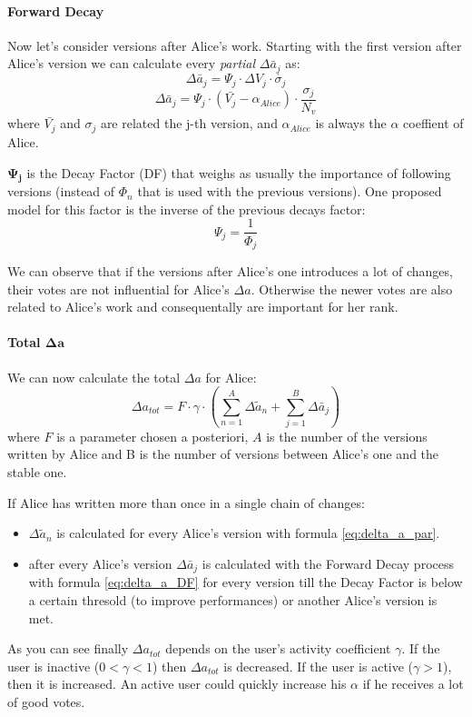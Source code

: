 \documentclass[a4paper,11pt]{article}
\newcommand{\al}{$\alpha$ }
\begin{document}
\paragraph{Forward Decay} Now let's consider versions after Alice's work. Starting with the first version after Alice's version we can calculate every \emph{partial} $\Delta \bar{a}_j$ as:
\begin{equation}
\Delta \bar{a}_j = \Psi_j \cdot \Delta V_j \cdot \mathring{\sigma_j}
\end{equation}
\begin{equation} \label{eq:delta_a_DF}
\Delta \bar{a}_j = \Psi_j \cdot \left(\bar{V_j}- \alpha_{Alice}\right) \cdot \frac{\sigma_j}{N_v}
\end{equation}
where $\bar{V_j}$ and $\sigma_j$ are related the j-th version, and $\alpha_{Alice}$ is always the \al coeffient of Alice.

$\mathbf{\Psi_j}$ is the Decay Factor (DF) that weighs as usually the importance of following versions (instead of $\Phi_n$ that is used with the previous versions). One proposed model for this factor is the inverse of the previous decays factor:
\begin{equation}
\Psi_j = \frac{1}{\Phi_j}
\end{equation}


We can observe that if the versions after Alice's one introduces a lot of changes, their votes are not influential for Alice's $\Delta a$. Otherwise the newer votes are also related to Alice's work and consequentally are important for her rank.

\paragraph{Total $\boldsymbol{\Delta a}$} We can now calculate the total $\Delta a$ for Alice:
\begin{equation}
\Delta a_{tot} = F \cdot \gamma \cdot \left(\sum_{n=1}^A \Delta \tilde{a}_n + \sum_{j=1}^B \Delta \bar{a}_j\right)
\end{equation}
where $F$ is a parameter chosen a posteriori, $A$ is the number of the versions written by Alice and B is the number of versions between Alice's one and the stable one.

If Alice has written more than once in a single chain of changes:
\begin{itemize}
\item $\Delta \tilde{a}_n$  is calculated for every Alice's version with formula \ref{eq:delta_a_par}.
\item after every Alice's version $\Delta \bar{a}_j$ is calculated with the Forward Decay process with formula \ref{eq:delta_a_DF} for every version till the Decay Factor is below a certain thresold (to improve performances) or another Alice's version is met.
\end{itemize}
As you can see finally $\Delta a_{tot}$ depends on the user's activity coefficient $\gamma$. If the user is inactive ($0 < \gamma < 1$) then  $\Delta a_{tot}$ is decreased. If the user is active ($\gamma >1$), then it is increased. An active user could quickly increase his \al if he receives a lot of good votes. 
\end{document}
